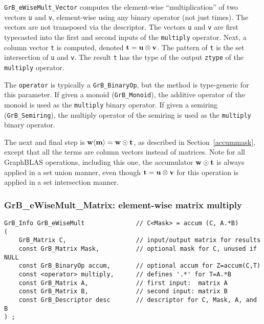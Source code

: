 \documentclass[12pt]{article}
\begin{document}
\verb'GrB_eWiseMult_Vector' computes the element-wise ``multiplication'' of two
vectors \verb'u' and \verb'v', element-wise using any binary operator (not just
times).  The vectors are not transposed via the descriptor.  The vectors
\verb'u' and \verb'v' are first typecasted into the first and second inputs of
the \verb'multiply' operator.  Next, a column vector \verb't' is computed,
denoted ${\bf t = u \otimes v}$.  The pattern of \verb't' is the set
intersection of \verb'u' and \verb'v'.  The result \verb't' has the type of the
output \verb'ztype' of the \verb'multiply' operator.

The \verb'operator' is typically a \verb'GrB_BinaryOp', but the method is
type-generic for this parameter.  If given a monoid (\verb'GrB_Monoid'), the
additive operator of the monoid is used as the \verb'multiply' binary operator.
If given a semiring (\verb'GrB_Semiring'), the multiply operator of the
semiring is used as the \verb'multiply' binary operator.

The next and final step is ${\bf w \langle m \rangle  = w \odot t}$, as
described in Section~\ref{accummask}, except that all the terms are column
vectors instead of matrices.  Note for all GraphBLAS operations, including this
one, the accumulator ${\bf w \odot t}$ is always applied in a set union manner,
even though ${\bf t = u \otimes v}$ for this operation is applied in a set
intersection manner.

\newpage
\subsubsection{{\sf GrB\_eWiseMult\_Matrix:} element-wise matrix multiply}
\label{eWiseMult_matrix}

\begin{mdframed}[userdefinedwidth=6in]
{\footnotesize
\begin{verbatim}
GrB_Info GrB_eWiseMult              // C<Mask> = accum (C, A.*B)
(
    GrB_Matrix C,                   // input/output matrix for results
    const GrB_Matrix Mask,          // optional mask for C, unused if NULL
    const GrB_BinaryOp accum,       // optional accum for Z=accum(C,T)
    const <operator> multiply,      // defines '.*' for T=A.*B
    const GrB_Matrix A,             // first input:  matrix A
    const GrB_Matrix B,             // second input: matrix B
    const GrB_Descriptor desc       // descriptor for C, Mask, A, and B
) ;
\end{verbatim}
} \end{mdframed}
\end{document}
